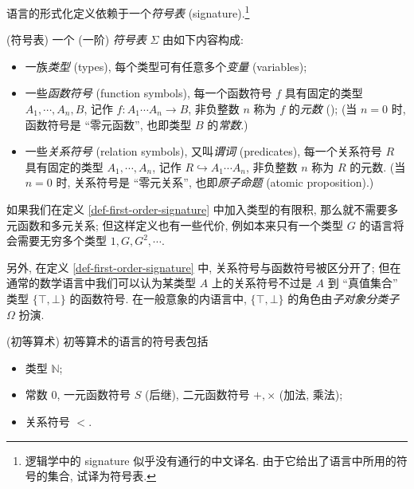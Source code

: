 语言的形式化定义依赖于一个\emph{符号表} (signature).\footnote{逻辑学中的 signature 似乎没有通行的中文译名. 由于它给出了语言中所用的符号的集合, 试译为符号表.}

\begin{definition}
	[label={def-first-order-signature}]
	{(符号表)}
	一个 (一阶) \emph{符号表} $\Sigma$ 由如下内容构成:
	\begin{itemize}
		\item 一族\emph{类型} (types),
		每个类型可有任意多个\emph{变量} (variables)\footnotemark;
		\item 一些\emph{函数符号} (function symbols),
		每一个函数符号 $f$ 具有固定的类型 $A_1,\cdots,A_n,B$, 记作 $f \colon A_1\cdots A_n \to B$, 非负整数 $n$ 称为 $f$ 的\emph{元数} (); (当 $n=0$ 时, 函数符号是 ``零元函数'', 也即类型 $B$ 的\emph{常数}.)
		\item 一些\emph{关系符号} (relation symbols), 又叫\emph{谓词} (predicates),
		每一个关系符号 $R$ 具有固定的类型 $A_1,\cdots,A_n$, 记作 $R \hookrightarrow A_1\cdots A_n$, 非负整数 $n$ 称为 $R$ 的元数. (当 $n=0$ 时, 关系符号是 ``零元关系'', 也即\emph{原子命题} (atomic proposition).)
	\end{itemize}
\end{definition}

\begin{remark}{}
	如果我们在定义 \ref{def-first-order-signature} 中加入类型的有限积, 那么就不需要多元函数和多元关系; 但这样定义也有一些代价, 例如本来只有一个类型 $G$ 的语言将会需要无穷多个类型 $1,G,G^2,\cdots$.
	
	另外, 在定义 \ref{def-first-order-signature} 中, 关系符号与函数符号被区分开了; 但在通常的数学语言中我们可以认为某类型 $A$ 上的关系符号不过是 $A$ 到 ``真值集合'' 类型 $\{\top,\bot\}$ 的函数符号. 在一般意象的内语言中, $\{\top,\bot\}$ 的角色由\emph{子对象分类子} $\Omega$ 扮演.
\end{remark}

\begin{example}
	[label={natural-numbers-language}]
	{(初等算术)}
	初等算术的语言的符号表包括
	\begin{itemize}
		\item 类型 $\mathbb{N}$;
		\item 常数 $0$, 一元函数符号 $S$ (后继), 二元函数符号 $+,\times$ (加法, 乘法);
		\item 关系符号 $<$.
	\end{itemize}
\end{example}

